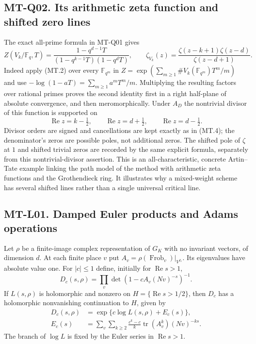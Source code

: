 \subsection*{MT-Q02. Its arithmetic zeta function and shifted zero lines}
The exact all-prime formula in MT-Q01 gives
\[
 Z(V_k/\mathbb F_q,T)
     =\frac{1-q^{d-1}T}{(1-q^{k-1}T)(1-q^dT)},
 \qquad
 \zeta_{V_k}(z)
     =\frac{\zeta(z-k+1)\zeta(z-d)}{\zeta(z-d+1)}.       \tag{MT.4}
\]
Indeed apply (MT.2) over every $\mathbb F_{q^m}$ in
$Z=\exp(\sum_{m\ge1}\#V_k(\mathbb F_{q^m})T^m/m)$ and use
$-\log(1-aT)=\sum_{m\ge1}a^mT^m/m$.  Multiplying the resulting factors
over rational primes proves the second identity first in a right
half-plane of absolute convergence, and then meromorphically.
Under $A_D$ the nontrivial divisor of this function is supported on
\[
    \operatorname{Re}z=k-\tfrac12,\qquad
    \operatorname{Re}z=d+\tfrac12,\qquad
    \operatorname{Re}z=d-\tfrac12.
\]
Divisor orders are signed and cancellations are kept exactly as in
(MT.4); the denominator's zeros are possible poles, not additional zeros.
The shifted pole of $\zeta$ at $1$ and shifted trivial zeros are recorded
by the same explicit formula, separately from this nontrivial-divisor
assertion.  This is an all-characteristic, concrete Artin--Tate example
linking the path model of the method with arithmetic zeta functions and
the Grothendieck ring.  It illustrates why a mixed-weight scheme has
several shifted lines rather than a single universal critical line.

\subsection*{MT-L01. Damped Euler products and Adams operations}
Let $\rho$ be a finite-image complex representation of $G_K$ with no
invariant vectors, of dimension $d$.  At each finite place $v$ put
$A_v=\rho(\operatorname{Frob}_v)|_{V^{I_v}}$.  Its eigenvalues have
absolute value one.  For $|c|\le1$ define, initially for $\operatorname{Re}s>1$,
\[
 D_c(s,\rho)=\prod_v\det(1-cA_v(Nv)^{-s})^{-1}.
\]
If $L(s,\rho)$ is holomorphic and nonzero on
$H=\{\operatorname{Re}s>1/2\}$, then $D_c$ has a holomorphic nonvanishing
continuation to $H$, given by
\begin{align*}
 D_c(s,\rho)&=\exp\{c\log L(s,\rho)+E_c(s)\},\\
 E_c(s)&=\sum_v\sum_{k\ge2}
   \frac{c^k-c}{k}\operatorname{tr}(A_v^k)(Nv)^{-ks}.
\end{align*}
The branch of $\log L$ is fixed by the Euler series in
$\operatorname{Re}s>1$.

